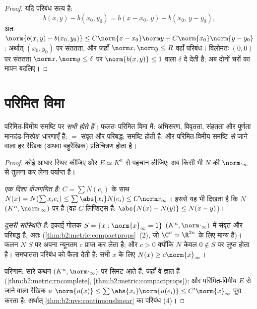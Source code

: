 \begin{proof}
यदि परिबंध सत्य है:
\[
b(x,y) - b(x_0,y_0) = b(x - x_0,\, y) + b(x_0,\, y - y_0),
\]
अतः $\norm{b(x,y) - b(x_0,y_0)} \leq C\norm{x - x_0}\norm y +
C\norm{x_0}\norm{y - y_0}$: अर्थात् $(x_0, y_0)$ पर संततता, और जहाँ $\norm x, \norm y \leq R$ वहाँ  परिबंध।
विलोमतः $(0,0)$ पर संततता $\norm x, \norm y \leq \delta$ पर $\norm{b(x,y)} \leq 1$ वाला $\delta$ दे देती है; अब दोनों चरों का
मापन बदलिए।
\end{proof}

\section{परिमित विमा}

\begin{theorem}[परिमित विमा में मानदंडों की तुल्यता]\label{thm:b2:nvs:finitedim}
परिमित-विमीय समष्टि पर \emph{सभी   होते
हैं}। फलतः परिमित विमा में: अभिसरण, विवृतता,
संहतता और पूर्णता मानदंड-निरपेक्ष धारणाएँ हैं;  $=$ संवृत और
परिबद्ध; समष्टि  होती है; और परिमित-विमीय समष्टि \emph{से} जाने
वाला हर रैखिक (अथवा बहुरैखिक) प्रतिचित्रण  होता है।
\end{theorem}

\begin{proof}
कोई आधार स्थिर कीजिए और $E \simeq K^n$ से पहचान लीजिए; अब किसी भी  $N$ की
$\norm\cdot_\infty$ से तुलना कर लेना पर्याप्त है।

\emph{एक दिशा बीजगणित है:} $C = \sum N(e_i)$ के साथ $N(x) = N(\sum x_i e_i) \leq
\sum \abs{x_i} N(e_i) \leq C \norm x_\infty$। इससे यह भी दिखता है कि $N$
$(K^n, \norm\cdot_\infty)$ पर  है (वह $C$-लिप्शिट्स है: $\abs{N(x) - N(y)} \leq N(x - y)$)।

\emph{दूसरी सांस्थिति है:} इकाई गोलक $S = \{x :
\norm{x}_\infty = 1\}$ $(K^n,
\norm\cdot_\infty)$ में संवृत और परिबद्ध है,
अतः  (\cref{thm:b2:metric:compactprops}~(2), जो $\C^n \simeq
\R^{2n}$ के लिए मान्य है)।  फलन $N$ $S$ पर अपना
न्यूनतम $c$ प्राप्त कर लेता है; और $c > 0$ क्योंकि $N$ केवल $0 \notin S$ पर लुप्त
होता है। समघातता परिबंध को फैला देती है: सभी $x$ के लिए $N(x) \geq c \norm{x}_\infty$।

परिणाम: सारे कथन $(K^n,
\norm\cdot_\infty)$ पर सिमट आते हैं, जहाँ वे ज्ञात हैं (\cref{thm:b2:metric:rncomplete}, \cref{thm:b2:metric:compactprops});
और परिमित-विमीय $E$ से जाने वाला रैखिक $u$ $\norm{u(x)} \leq \sum\abs{x_i}
\norm{u(e_i)} \leq C'\norm{x}_\infty$ पूरा करता है: अर्थात्
\cref{thm:b2:nvs:continuouslinear} का परिबंध (4)।
\end{proof}

